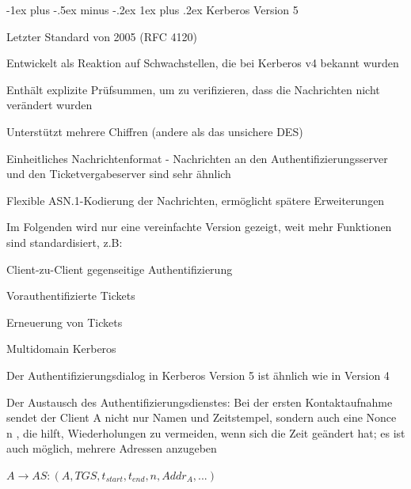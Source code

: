 \documentclass[a4paper]{article}
\makeatletter
\renewcommand{\subsubsection}{\@startsection{subsubsection}{3}{0mm}%
 {-1ex plus -.5ex minus -.2ex}%
 {1ex plus .2ex}%
 {\normalfont\small\bfseries}}
\makeatother
\begin{document}
\begin{multicols}{3}
      \subsubsection{Kerberos Version 5}
      \begin{itemize*}
            \item Letzter Standard von 2005 (RFC 4120)
            \item Entwickelt als Reaktion auf Schwachstellen, die bei Kerberos v4 bekannt wurden
            \begin{itemize*}
                  \item Enthält explizite Prüfsummen, um zu verifizieren, dass die Nachrichten nicht verändert wurden
                  \item Unterstützt mehrere Chiffren (andere als das unsichere DES)
            \end{itemize*}
            \item Einheitliches Nachrichtenformat - Nachrichten an den Authentifizierungsserver und den Ticketvergabeserver sind sehr ähnlich
            \item Flexible ASN.1-Kodierung der Nachrichten, ermöglicht spätere Erweiterungen
            \item Im Folgenden wird nur eine vereinfachte Version gezeigt, weit mehr Funktionen sind standardisiert, z.B:
            \begin{itemize*}
                  \item Client-zu-Client gegenseitige Authentifizierung
                  \item Vorauthentifizierte Tickets
                  \item Erneuerung von Tickets
                  \item Multidomain Kerberos
            \end{itemize*}
            \item Der Authentifizierungsdialog in Kerberos Version 5 ist ähnlich wie in Version 4
            \item Der Austausch des Authentifizierungsdienstes: Bei der ersten Kontaktaufnahme sendet der Client A nicht nur Namen und Zeitstempel, sondern auch eine Nonce n , die hilft, Wiederholungen zu vermeiden, wenn sich die Zeit geändert hat; es ist auch möglich, mehrere Adressen anzugeben
            \begin{enumerate*}
                  \item $A\rightarrow AS:(A,TGS,t_{start},t_{end},n,Addr_A, ...)$
            \end{enumerate*}

\end{itemize*}
\end{multicols}
\end{document}
